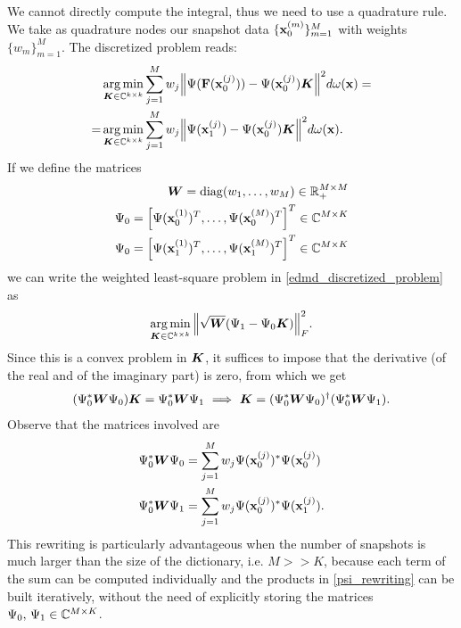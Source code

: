 We cannot directly compute the integral, thus we need to use a quadrature rule. We take as quadrature nodes our snapshot data $\{\vb{x}_0^{(m)}\}_{m = 1}^M$ with weights $\{w_m\}_{m = 1}^M$. The discretized problem reads:
\begin{equation}
\label{edmd_discretized_problem}
\begin{split}
    &\operatorname*{arg\,min}_{\vb*{K}\in\mathbb{C}^{k\times k}} \sum_{j=1}^M w_j \norm{\Psi(\vb{F}(\vb{x}_0^{(j)})) - \Psi(\vb{x}_0^{(j)})\vb*{K}}^2 d\omega(\vb{x}) = \\
    = &\operatorname*{arg\,min}_{\vb*{K}\in\mathbb{C}^{k\times k}} \sum_{j=1}^M w_j \norm{\Psi(\vb{x}_1^{(j)}) - \Psi(\vb{x}_0^{(j)})\vb*{K}}^2 d\omega(\vb{x}).
\end{split}    
\end{equation}
If we define the matrices
\begin{align}
\label{w_def}
\vb*{W} = \mathrm{diag}(w_1,\dots,w_M)\in\mathbb{R}_+^{M\times M} \\
\label{psi0_def}
\Psi_0 = \left[\Psi(\vb{x}_0^{(1)})^T,\dots,\Psi(\vb{x}_0^{(M)})^T\right]^T\in\mathbb{C}^{M\times K} \\
\label{psi1_def}
\Psi_0 = \left[\Psi(\vb{x}_1^{(1)})^T,\dots,\Psi(\vb{x}_1^{(M)})^T\right]^T\in\mathbb{C}^{M\times K}
\end{align}
we can write the weighted least-square problem in \eqref{edmd_discretized_problem} as 
\begin{equation}
    \label{edmd_discretized_problem_matrix}
    \operatorname*{arg\,min}_{\vb*{K}\in\mathbb{C}^{k\times k}}\norm{\sqrt{\vb*{W}}(\Psi_1 - \Psi_0\vb*{K})}_F^2.
\end{equation}
Since this is a convex problem in $\vb*{K}$, it suffices to impose that the derivative (of the real and of the imaginary part) is zero, from which we get
\begin{equation}
    \label{discretized_problem_solution}
    (\Psi_0^*\vb*{W}\Psi_0)\vb*{K} = \Psi_0^*\vb*{W}\Psi_1 \,\,\Longrightarrow\,\, \vb*{K} = (\Psi_0^*\vb*{W}\Psi_0)^{\dagger}(\Psi_0^*\vb*{W}\Psi_1).
\end{equation}
Observe that the matrices involved are
\begin{equation*}
    \label{psi_rewriting}
    \begin{split}
        \Psi_0^*\vb*{W}\Psi_0 & = \sum_{j=1}^M w_j \Psi(\vb{x}_0^{(j)})^* \Psi(\vb{x}_0^{(j)})\\
        \Psi_0^*\vb*{W}\Psi_1 & = \sum_{j=1}^M w_j \Psi(\vb{x}_0^{(j)})^* \Psi(\vb{x}_1^{(j)}).
    \end{split}
\end{equation*}
This rewriting is particularly advantageous when the number of snapshots is much larger than the size of the dictionary, i.e. $M >> K$, because each term of the sum can be computed individually and the products in \eqref{psi_rewriting} can be built iteratively, without the need of explicitly storing the matrices $\Psi_0,\,\Psi_1\in\mathbb{C}^{M\times K}$.

